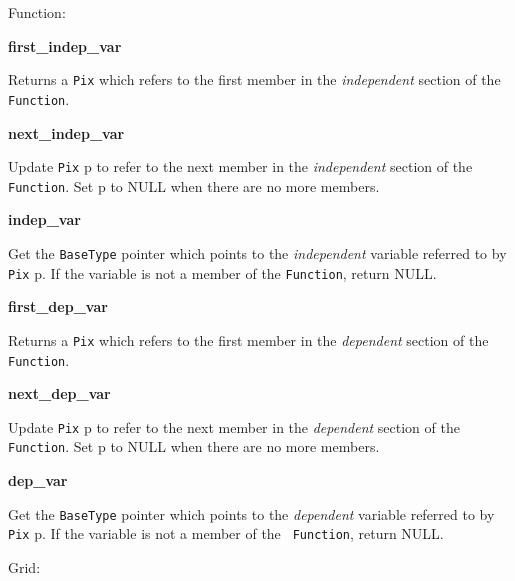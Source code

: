 Function:

\begin{description}

\item {\bf first\_indep\_var}


Returns a {\tt Pix} which refers to the first member in the {\em
independent\/} section of the {\tt Function}.

\item {\bf next\_indep\_var}


Update {\tt Pix} p to refer to the next member in the {\em independent\/}
section of the {\tt Function}. Set p to NULL when there are no more members.

\item {\bf indep\_var}


Get the {\tt BaseType} pointer which points to the {\em independent\/}
variable referred to by {\tt Pix} p. If the variable is not a member of the
{\tt Function}, return NULL.

\item {\bf first\_dep\_var}


Returns a {\tt Pix} which refers to the first member in the {\em dependent\/}
section of the {\tt Function}.

\item {\bf next\_dep\_var}


Update {\tt Pix} p to refer to the next member in the {\em dependent\/}
section of the {\tt Function}. Set p to NULL when there are no more members.

\item {\bf dep\_var}


Get the {\tt BaseType} pointer which points to the {\em dependent\/} variable
referred to by {\tt Pix} p. If the variable is not a member of the {\tt
Function}, return NULL.

\end{description}

Grid:

